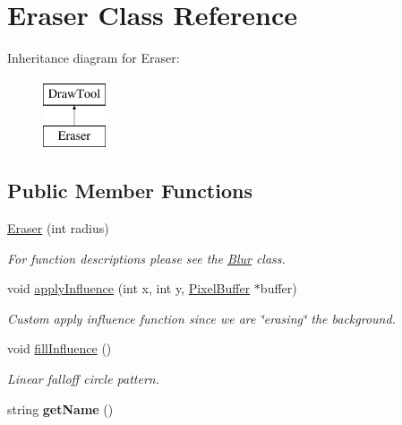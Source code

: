 \hypertarget{classEraser}{\section{Eraser Class Reference}
\label{classEraser}
}
Inheritance diagram for Eraser\-:\begin{figure}[H]
\begin{center}
\leavevmode
\includegraphics[height=2.000000cm]{classEraser}
\end{center}
\end{figure}
\subsection*{Public Member Functions}
\begin{DoxyCompactItemize}
\item 
\hyperlink{classEraser_a60abccb4522452a4cdfb714eafbc9c16}{Eraser} (int radius)
\begin{DoxyCompactList}\small\item\em For function descriptions please see the \hyperlink{classBlur}{Blur} class. \end{DoxyCompactList}\item 
\hypertarget{classEraser_a195eeec6843317ee33e0e51fccb3daff}{void \hyperlink{classEraser_a195eeec6843317ee33e0e51fccb3daff}{apply\-Influence} (int x, int y, \hyperlink{classPixelBuffer}{Pixel\-Buffer} $\ast$buffer)}\label{classEraser_a195eeec6843317ee33e0e51fccb3daff}

\begin{DoxyCompactList}\small\item\em Custom apply influence function since we are \char`\"{}erasing\char`\"{} the background. \end{DoxyCompactList}\item 
\hypertarget{classEraser_ad718ebd5796e0a83dbd94aa4f0ce2921}{void \hyperlink{classEraser_ad718ebd5796e0a83dbd94aa4f0ce2921}{fill\-Influence} ()}\label{classEraser_ad718ebd5796e0a83dbd94aa4f0ce2921}

\begin{DoxyCompactList}\small\item\em Linear falloff circle pattern. \end{DoxyCompactList}\item 
\hypertarget{classEraser_ac83b9aa44690af5d4043bce157a8ff3d}{string {\bfseries get\-Name} ()}\label{classEraser_ac83b9aa44690af5d4043bce157a8ff3d}

\end{DoxyCompactItemize}
